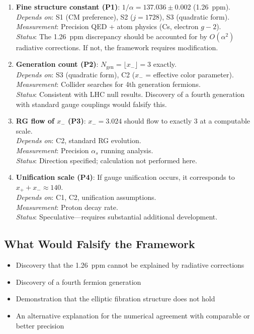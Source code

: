 \documentclass[11pt,a4paper]{article}
\theoremstyle{definition}
\theoremstyle{remark}
\begin{document}
\begin{enumerate}
    \item \textbf{Fine structure constant (P1)}: $1/\alpha = 137.036 \pm 0.002$ (1.26~ppm). \\
    \emph{Depends on}: S1 (CM preference), S2 ($j=1728$), S3 (quadratic form). \\
    \emph{Measurement}: Precision QED + atom physics (Cs, electron $g-2$). \\
    \emph{Status}: The 1.26~ppm discrepancy should be accounted for by $O(\alpha^2)$ radiative corrections. If not, the framework requires modification.

    \item \textbf{Generation count (P2)}: $N_{\text{gen}} = \lfloor x_- \rfloor = 3$ exactly. \\
    \emph{Depends on}: S3 (quadratic form), C2 ($x_-$ = effective color parameter). \\
    \emph{Measurement}: Collider searches for 4th generation fermions. \\
    \emph{Status}: Consistent with LHC null results. Discovery of a fourth generation with standard gauge couplings would falsify this.

    \item \textbf{RG flow of $x_-$ (P3)}: $x_- = 3.024$ should flow to exactly 3 at a computable scale. \\
    \emph{Depends on}: C2, standard RG evolution. \\
    \emph{Measurement}: Precision $\alpha_s$ running analysis. \\
    \emph{Status}: Direction specified; calculation not performed here.

    \item \textbf{Unification scale (P4)}: If gauge unification occurs, it corresponds to $x_+ + x_- \approx 140$. \\
    \emph{Depends on}: C1, C2, unification assumptions. \\
    \emph{Measurement}: Proton decay rate. \\
    \emph{Status}: Speculative---requires substantial additional development.
\end{enumerate}

\subsection{What Would Falsify the Framework}

\begin{itemize}
    \item Discovery that the 1.26~ppm cannot be explained by radiative corrections
    \item Discovery of a fourth fermion generation
    \item Demonstration that the elliptic fibration structure does not hold
    \item An alternative explanation for the numerical agreement with comparable or better precision
\end{itemize}
\end{document}
